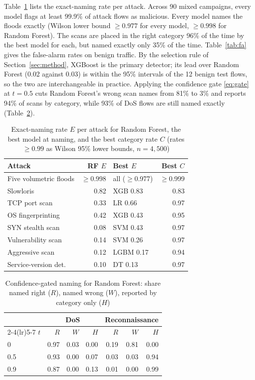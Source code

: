\documentclass[preprint,12pt]{elsarticle}
\begin{document}
Table~\ref{tab:perattack} lists the exact-naming rate per attack. Across 90 mixed campaigns, every model flags at least 99.9\% of attack flows as malicious. Every model names the floods exactly (Wilson lower bound $\ge 0.977$ for every model, $\ge 0.998$ for Random Forest). The scans are placed in the right category 96\% of the time by the best model for each, but named exactly only 35\% of the time. Table~\ref{tab:fa} gives the false-alarm rates on benign traffic. By the selection rule of Section~\ref{sec:method}, XGBoost is the primary detector; its lead over Random Forest (0.02 against 0.03) is within the 95\% intervals of the 12 benign test flows, so the two are interchangeable in practice. Applying the confidence gate \eqref{eq:gate} at $t = 0.5$ cuts Random Forest's wrong scan names from 81\% to 3\% and reports 94\% of scans by category, while 93\% of DoS flows are still named exactly (Table~\ref{tab:gate}).

\begin{table}[!t]
\caption{Exact-naming rate $E$ per attack for Random Forest, the best model at naming, and the best category rate $C$ (rates $\ge 0.99$ as Wilson 95\% lower bounds, $n = 4{,}500$)}
\label{tab:perattack}
\centering
\footnotesize
\begin{tabular}{@{}lrlr@{}}
\toprule
\textbf{Attack} & \textbf{RF $E$} & \textbf{Best $E$} & \textbf{Best $C$} \\
\midrule
Five volumetric floods & $\ge$0.998 & all ($\ge$0.977) & $\ge$0.999 \\
Slowloris & 0.82 & XGB 0.83 & 0.83 \\
TCP port scan & 0.33 & LR 0.66 & 0.97 \\
OS fingerprinting & 0.42 & XGB 0.43 & 0.95 \\
SYN stealth scan & 0.08 & SVM 0.43 & 0.97 \\
Vulnerability scan & 0.14 & SVM 0.26 & 0.97 \\
Aggressive scan & 0.12 & LGBM 0.17 & 0.94 \\
Service-version det. & 0.10 & DT 0.13 & 0.97 \\
\bottomrule
\end{tabular}
\end{table}

\begin{table}[!t]
\caption{Confidence-gated naming for Random Forest: share named right ($R$), named wrong ($W$), reported by category only ($H$)}
\label{tab:gate}
\centering
\footnotesize
\begin{tabular}{@{}lrrrrrr@{}}
\toprule
 & \multicolumn{3}{c}{\textbf{DoS}} & \multicolumn{3}{c}{\textbf{Reconnaissance}} \\
\cmidrule(lr){2-4}\cmidrule(lr){5-7}
$t$ & $R$ & $W$ & $H$ & $R$ & $W$ & $H$ \\
\midrule
0   & 0.97 & 0.03 & 0.00 & 0.19 & 0.81 & 0.00 \\
0.5 & 0.93 & 0.00 & 0.07 & 0.03 & 0.03 & 0.94 \\
0.9 & 0.87 & 0.00 & 0.13 & 0.01 & 0.00 & 0.99 \\
\bottomrule
\end{tabular}
\end{table}
\end{document}

